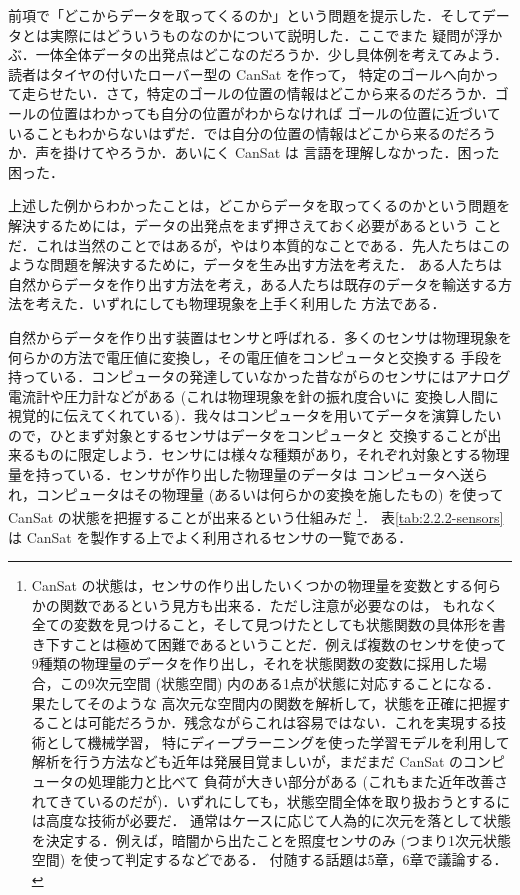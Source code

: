 \documentclass[dvipdfmx]{jsbook}
\begin{document}
  前項で「どこからデータを取ってくるのか」という問題を提示した．そしてデータとは実際にはどういうものなのかについて説明した．ここでまた
  疑問が浮かぶ．一体全体データの出発点はどこなのだろうか．少し具体例を考えてみよう．読者はタイヤの付いたローバー型の CanSat を作って，
  特定のゴールへ向かって走らせたい．さて，特定のゴールの位置の情報はどこから来るのだろうか．ゴールの位置はわかっても自分の位置がわからなければ
  ゴールの位置に近づいていることもわからないはずだ．では自分の位置の情報はどこから来るのだろうか．声を掛けてやろうか．あいにく CanSat は
  言語を理解しなかった．困った困った．

  上述した例からわかったことは，どこからデータを取ってくるのかという問題を解決するためには，データの出発点をまず押さえておく必要があるという
  ことだ．これは当然のことではあるが，やはり本質的なことである．先人たちはこのような問題を解決するために，データを生み出す方法を考えた．
  ある人たちは自然からデータを作り出す方法を考え，ある人たちは既存のデータを輸送する方法を考えた．いずれにしても物理現象を上手く利用した
  方法である．

  自然からデータを作り出す装置はセンサと呼ばれる．多くのセンサは物理現象を何らかの方法で電圧値に変換し，その電圧値をコンピュータと交換する
  手段を持っている．コンピュータの発達していなかった昔ながらのセンサにはアナログ電流計や圧力計などがある (これは物理現象を針の振れ度合いに
  変換し人間に視覚的に伝えてくれている)．我々はコンピュータを用いてデータを演算したいので，ひとまず対象とするセンサはデータをコンピュータと
  交換することが出来るものに限定しよう．センサには様々な種類があり，それぞれ対象とする物理量を持っている．センサが作り出した物理量のデータは
  コンピュータへ送られ，コンピュータはその物理量 (あるいは何らかの変換を施したもの) を使って CanSat の状態を把握することが出来るという仕組みだ
  \footnote{CanSat の状態は，センサの作り出したいくつかの物理量を変数とする何らかの関数であるという見方も出来る．ただし注意が必要なのは，
  もれなく全ての変数を見つけること，そして見つけたとしても状態関数の具体形を書き下すことは極めて困難であるということだ．例えば複数のセンサを使って
  9種類の物理量のデータを作り出し，それを状態関数の変数に採用した場合，この9次元空間 (状態空間) 内のある1点が状態に対応することになる．果たしてそのような
  高次元な空間内の関数を解析して，状態を正確に把握することは可能だろうか．残念ながらこれは容易ではない．これを実現する技術として機械学習，
  特にディープラーニングを使った学習モデルを利用して解析を行う方法なども近年は発展目覚ましいが，まだまだ CanSat のコンピュータの処理能力と比べて
  負荷が大きい部分がある (これもまた近年改善されてきているのだが)．いずれにしても，状態空間全体を取り扱おうとするには高度な技術が必要だ．
  通常はケースに応じて人為的に次元を落として状態を決定する．例えば，暗闇から出たことを照度センサのみ (つまり1次元状態空間) を使って判定するなどである．
  付随する話題は5章，6章で議論する．}．
  表\ref{tab:2.2.2-sensors}は CanSat を製作する上でよく利用されるセンサの一覧である．
\end{document}
